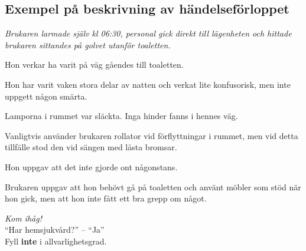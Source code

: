 \documentclass[paper=a5,DIV=15,headinclude,twoside=semi,openany,titlepage=firstiscover]{scrbook}
\begin{document}
\subsection*{Exempel på beskrivning av händelseförloppet}

{\itshape
	Brukaren larmade själv kl 06:30, personal gick direkt till lägenheten och hittade brukaren sittandes på golvet utanför toaletten. 
	
	\noindent Hon verkar ha varit på väg gåendes till toaletten. 
	
	\noindent Hon har varit vaken stora delar av natten och verkat lite konfusorisk, men inte uppgett någon smärta. 
	
	\noindent Lamporna i rummet var släckta. Inga hinder fanns i hennes väg.
	
	\noindent Vanligtvis använder brukaren rollator vid förflyttningar i rummet, men vid detta tillfälle stod den vid sängen med låsta bromsar. 
	
	\noindent Hon uppgav att det inte gjorde ont någonstans. 
	
	\noindent Brukaren uppgav att hon behövt gå på toaletten och använt möbler som stöd när hon gick, men att hon inte fått ett bra grepp om något.
}

\clearpage

\begin{center}
\Huge\textit{Kom ihåg!}\Large\\[2ex]

``Har hemsjukvård?'' -- ``Ja''\\[2ex]

Fyll \textbf{inte} i allvarlighetsgrad.
\end{center}%
\end{document}
